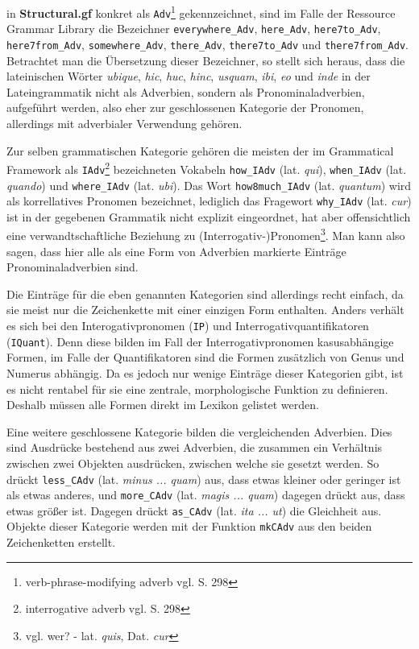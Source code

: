 in \textbf{Structural.gf} konkret als \texttt{Adv}\footnote{verb-phrase-modifying adverb vgl. \cite{RANTA2011} S. 298} gekennzeichnet, sind im Falle der Ressource Grammar Library die Bezeichner \texttt{everywhere\_Adv}, \texttt{here\_Adv}, \texttt{here7to\_Adv}, \texttt{here7from\_Adv}, \texttt{somewhere\_Adv}, \texttt{there\_Adv}, \texttt{there7to\_Adv} und \texttt{there7from\_Adv}. Betrachtet man die Übersetzung dieser Bezeichner, so stellt sich heraus, dass die lateinischen Wörter \textit{ubique}, \textit{hic}, \textit{huc}, \textit{hinc}, \textit{usquam}, \textit{ibi}, \textit{eo} und \textit{inde} in der Lateingrammatik nicht als Adverbien, sondern als Pronominaladverbien, aufgeführt werden, also eher zur geschlossenen Kategorie der Pronomen, allerdings mit adverbialer Verwendung gehören. \par
Zur selben grammatischen Kategorie gehören die meisten der im Grammatical Framework als \texttt{IAdv}\footnote{interrogative adverb vgl. \cite{RANTA2011} S. 298} bezeichneten Vokabeln \texttt{how\_IAdv} (lat. \textit{qui}), \texttt{when\_IAdv} (lat. \textit{quando}) und \texttt{where\_IAdv} (lat. \textit{ubi}). Das Wort \texttt{how8much\_IAdv} (lat. \textit{quantum}) wird als korrellatives Pronomen bezeichnet, lediglich das Fragewort \texttt{why\_IAdv} (lat. \textit{cur}) ist in der gegebenen Grammatik nicht explizit eingeordnet, hat aber offensichtlich eine verwandtschaftliche Beziehung zu (Interrogativ-)Pronomen\footnote {vgl. wer? -  lat. \textit{quis}, Dat. \textit{cur}}. Man kann also sagen, dass hier alle als eine Form von Adverbien markierte Einträge Pronominaladverbien sind.\par
Die Einträge für die eben genannten Kategorien sind allerdings recht einfach, da sie meist nur die Zeichenkette mit einer einzigen Form enthalten. Anders verhält es sich bei den Interogativpronomen (\texttt{IP}) und Interrogativquantifikatoren (\texttt{IQuant}). Denn diese bilden im Fall der Interrogativpronomen kasusabhängige Formen, im Falle der Quantifikatoren sind die Formen zusätzlich von Genus und Numerus abhängig. Da es jedoch nur wenige Einträge dieser Kategorien gibt, ist es nicht rentabel für sie eine zentrale, morphologische Funktion zu definieren. Deshalb müssen alle Formen direkt im Lexikon gelistet werden. \par
Eine weitere geschlossene Kategorie bilden die vergleichenden Adverbien. Dies sind Ausdrücke bestehend aus zwei Adverbien, die zusammen ein Verhältnis zwischen zwei Objekten ausdrücken, zwischen welche sie gesetzt werden. So drückt \texttt{less\_CAdv} (lat. \textit{minus ... quam}) aus, dass etwas kleiner oder geringer ist als etwas anderes, und \texttt{more\_CAdv} (lat. \textit{magis ... quam}) dagegen drückt aus, dass etwas größer ist. Dagegen drückt \texttt{as\_CAdv} (lat. \textit{ita ... ut}) die Gleichheit aus. Objekte dieser Kategorie werden mit der Funktion \texttt{mkCAdv} aus den beiden Zeichenketten erstellt. \par
